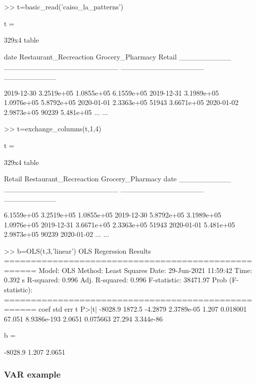\documentclass[10pt]{article}
\numberwithin{equation}{section}
\numberwithin{table}{section}
\numberwithin{figure}{section}
\begin{document}
\begin{Command}
>> t=basic_read('caiso_la_patterns')

t =

  329x4 table

       date       Restaurant_Recreaction    Grocery_Pharmacy      Retail  
    __________    ______________________    ________________    __________

    2019-12-30          3.2519e+05             1.0855e+05       6.1559e+05
    2019-12-31          3.1989e+05             1.0976e+05       5.8792e+05
    2020-01-01          2.3363e+05                  51943       3.6671e+05
    2020-01-02          2.9873e+05                  90239        5.481e+05
                ...                                     ...

>> t=exchange_columns(t,1,4)

t =

  329x4 table

      Retail      Restaurant_Recreaction    Grocery_Pharmacy       date   
    __________    ______________________    ________________    __________

    6.1559e+05          3.2519e+05             1.0855e+05       2019-12-30
    5.8792e+05          3.1989e+05             1.0976e+05       2019-12-31
    3.6671e+05          2.3363e+05                  51943       2020-01-01
     5.481e+05          2.9873e+05                  90239       2020-01-02
              ...                                     ...

>> b=OLS(t,3,'linear')
               OLS Regerssion Results 
====================================================
           Model:                      OLS
           Method:           Least Squares
           Date:      29-Jun-2021 11:59:42
           Time:                   0.392 s
           R-squared:                0.996
           Adj. R-squared:           0.996
           F-statistic:              38471.97
           Prob (F-statistic):     
====================================================
        coef        std err        t         P>|t|      
      -8028.9       1872.5      -4.2879   2.3789e-05
        1.207     0.018001       67.051  8.9386e-193
       2.0651     0.075663       27.294    3.344e-86


b =

      -8028.9
        1.207
       2.0651

\end{Command}


\subsubsection{VAR example}\label{subsec:var example}
\end{document}
